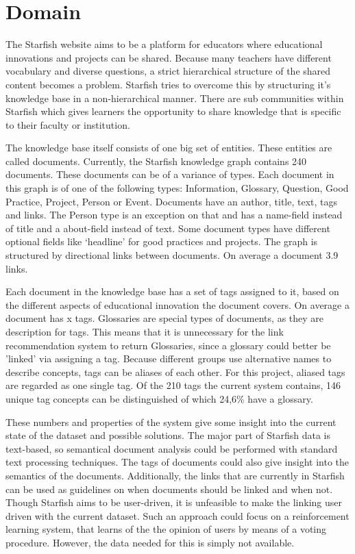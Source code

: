 

\section{Domain}
The Starfish website aims to be a platform for educators where educational innovations and projects can be shared. Because many teachers have different vocabulary and diverse questions, a strict hierarchical structure of the shared content becomes a problem. Starfish tries to overcome this by structuring it's knowledge base in a non-hierarchical manner. There are sub communities within Starfish which gives learners the opportunity to share knowledge that is specific to their faculty or institution. 

The knowledge base itself consists of one big set of entities. These entities are called documents. Currently, the Starfish knowledge graph contains 240 documents. These documents can be of a variance of types. Each document in this graph is of one of the following types: Information, Glossary, Question, Good Practice, Project, Person or Event. Documents have an author, title, text, tags and links. The Person type is an exception on that and has a name-field instead of title and a about-field instead of text. Some document types have different optional fields like `headline' for good practices and projects. The graph is structured by directional links between documents.  On average a document 3.9 links.

Each document in the knowledge base has a set of tags assigned to it, based on the different aspects of educational innovation the document covers. On average a document has x tags. Glossaries are special types of documents, as they are description for tags. This means that it is unnecessary for the link recommendation system to return Glossaries, since a glossary could better be 'linked' via assigning a tag. Because different groups use alternative names to describe concepts, tags can be aliases of each other. For this project, aliased tags are regarded as one single tag. Of the 210 tags the current system contains, 146 unique tag concepts can be distinguished of which 24,6\% have a glossary. 

These numbers and properties of the system give some insight into the current state of the dataset and possible solutions. The major part of Starfish data is text-based, so semantical document analysis could be performed with standard text processing techniques. The tags of documents could also give insight into the semantics of the documents. Additionally, the links that are currently in Starfish can be used as guidelines on when documents should be linked and when not. Though Starfish aims to be user-driven, it is unfeasible to make the linking user driven with the current dataset. Such an approach could focus on a reinforcement learning system, that learns of the the opinion of users by means of a voting procedure. However, the data needed for this is simply not available. 
